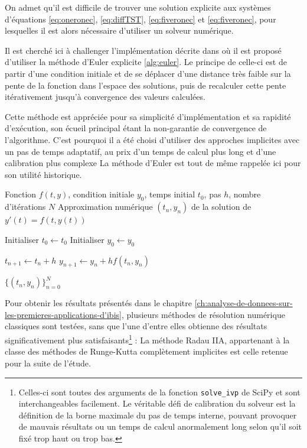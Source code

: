         On admet qu'il est difficile de trouver une solution explicite aux systèmes d'équations \ref{eq:oneronec}, \ref{eq:diffTST}, \ref{eq:fiveronec} et \ref{eq:fiveronec}, pour lesquelles il est alors nécessaire d'utiliser un solveur numérique.

        \begin{bluebox}
            Il est cherché ici à challenger l'implémentation décrite dans \cite{TST} où il est proposé d'utiliser la méthode d'Euler explicite \ref{alg:euler}.
            Le principe de celle-ci est de partir d'une condition initiale et de se déplacer d'une distance très faible sur la pente de la fonction dans
            l'espace des solutions, puis de recalculer cette pente itérativement jusqu'à convergence des valeurs calculées.

            Cette méthode est appréciée pour sa simplicité d'implémentation et sa rapidité d'exécution, son écueil principal étant la non-garantie de convergence de l'algorithme.
            C'est pourquoi il a été choisi d'utiliser des approches implicites avec un pas de temps adaptatif, au prix d'un temps de calcul plus long et d'une calibration plus complexe
            La méthode d'Euler est tout de même rappelée ici pour son utilité historique.
        \end{bluebox}

        \begin{algorithm}[H]
            \caption{Méthode d'Euler explicite}
            \label{alg:euler}
            \begin{algorithmic}[1]
            \Require
            Fonction $f(t,y)$, condition initiale $y_0$, temps initial $t_0$, pas $h$,
            nombre d'itérations $N$
            \Ensure
            Approximation numérique $(t_n, y_n)$ de la solution de $\displaystyle y'(t)=f(t,y(t))$

            \State Initialiser $t_0 \gets t_0$
            \State Initialiser $y_0 \gets y_0$

                \State $t_{n+1} \gets t_n + h$
                \State $y_{n+1} \gets y_n + h f(t_n, y_n)$
            \EndFor

            \State \Return $\{(t_n, y_n)\}_{n=0}^{N}$
        \end{algorithmic}
        \end{algorithm}

        Pour obtenir les résultats présentés dans le chapitre \ref{ch:analyse-de-donnees-sur-les-premieres-applications-d'ibis}, plusieurs méthodes de résolution numérique classiques sont testées, sans que l'une d'entre elles obtienne des résultats significativement plus satisfaisants\footnote{Celles-ci sont toutes des arguments de la fonction \texttt{solve\_ivp} de SciPy et sont interchangeables facilement. Le véritable défi de calibration du solveur est la définition de la borne maximale du pas de temps interne, pouvant provoquer de mauvais résultats ou un temps de calcul anormalement long selon qu'il soit fixé trop haut ou trop bas.} :
        La méthode Radau IIA, appartenant à la classe des méthodes de Runge-Kutta complètement implicites\cite{radau} est celle retenue pour la suite de l'étude.

